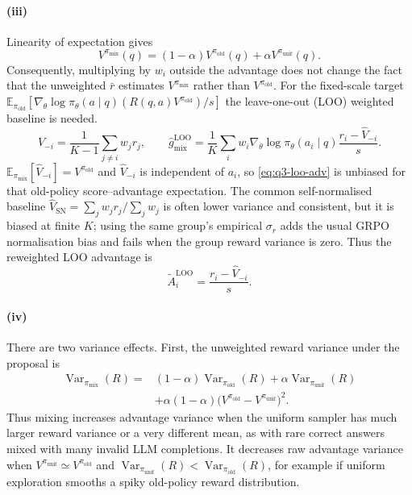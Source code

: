 \documentclass[11pt,a4paper]{article}
\begin{document}
\paragraph{(iii)}
Linearity of expectation gives
\[
    V^{\pi_{\mathrm{mix}}}(q)
    =(1-\alpha)V^{\pi_{\mathrm{old}}}(q)
      +\alpha V^{\pi_{\mathrm{unif}}}(q).
\]
Consequently, multiplying by $w_i$ outside the advantage does not change the fact that the unweighted $\bar r$ estimates $V^{\pi_{\mathrm{mix}}}$ rather than $V^{\pi_{\mathrm{old}}}$.  For the fixed-scale target $\mathbb{E}_{\pi_{\mathrm{old}}}[ \nabla_\theta\log\pi_\theta(a\mid q)(R(q,a) V^{\pi_{\mathrm{old}}})/s]$ the leave-one-out (LOO) weighted baseline is needed.
\begin{equation}
    \hat V_{-i}
      =\frac{1}{K-1}\sum_{j\ne i}w_jr_j,
    \qquad
    \hat g_{\mathrm{mix}}^{\mathrm{LOO}}
      =\frac{1}{K}\sum_i
        w_i\nabla_\theta\log\pi_\theta(a_i\mid q)
        \frac{r_i-\hat V_{-i}}{s}.
    \label{eq:q3-loo-adv}
\end{equation}
$\mathbb{E}_{\pi_{\mathrm{mix}}}[\hat V_{-i}] =V^{\pi_{\mathrm{old}}}$ and $\hat V_{-i}$ is independent of $a_i$, so \cref{eq:q3-loo-adv} is unbiased for that old-policy score--advantage expectation. The common self-normalised baseline $\hat V_{\mathrm{SN}}=\sum_jw_jr_j/\sum_jw_j$ is often lower variance and consistent, but it is biased at finite $K$; using the same group's empirical $\sigma_r$ adds the usual GRPO normalisation bias and fails when the group reward variance is zero. Thus the reweighted LOO advantage is
\[
    \tilde A_i^{\mathrm{LOO}}
    =
    \frac{r_i-\hat V_{-i}}{s}.
\]

\paragraph{(iv)}
There are two variance effects.  First, the unweighted reward variance under the proposal is
\begin{align*}
    \operatorname{Var}_{\pi_{\mathrm{mix}}}(R)
    ={}&(1-\alpha)\operatorname{Var}_{\pi_{\mathrm{old}}}(R)
       +\alpha\operatorname{Var}_{\pi_{\mathrm{unif}}}(R)\\
      &+\alpha(1-\alpha)
        \bigl(V^{\pi_{\mathrm{old}}}-V^{\pi_{\mathrm{unif}}}\bigr)^2 .
\end{align*}
Thus mixing increases advantage variance when the uniform sampler has much larger reward variance or a very different mean, as with rare correct answers mixed with many invalid LLM completions.  It decreases raw advantage variance when $V^{\pi_{\mathrm{unif}}}\simeq V^{\pi_{\mathrm{old}}}$ and
$\operatorname{Var}_{\pi_{\mathrm{unif}}}(R)
<\operatorname{Var}_{\pi_{\mathrm{old}}}(R)$, for example if uniform
exploration smooths a spiky old-policy reward distribution.
\end{document}
